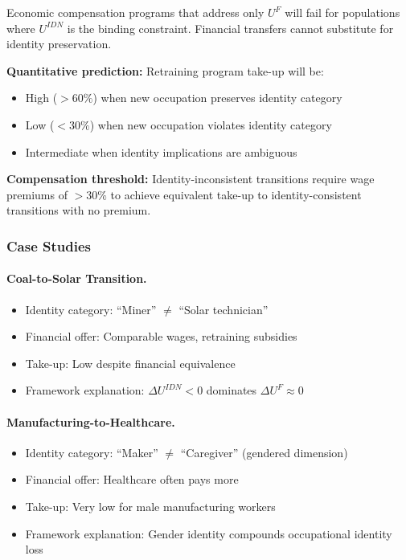 \begin{tcolorbox}[colback=blue!5!white, colframe=blue!75!black, title=Prediction 5: Identity Non-Fungibility]
Economic compensation programs that address only $U^F$ will fail for 
populations where $U^{IDN}$ is the binding constraint. Financial transfers 
cannot substitute for identity preservation.

\textbf{Quantitative prediction:} Retraining program take-up will be:
\begin{itemize}
  \item High ($>60\%$) when new occupation preserves identity category
  \item Low ($<30\%$) when new occupation violates identity category
  \item Intermediate when identity implications are ambiguous
\end{itemize}

\textbf{Compensation threshold:} Identity-inconsistent transitions require 
wage premiums of $>30\%$ to achieve equivalent take-up to identity-consistent 
transitions with no premium.
\end{tcolorbox}

\subsubsection{Case Studies}

\paragraph{Coal-to-Solar Transition.}
\begin{itemize}
  \item Identity category: ``Miner'' $\neq$ ``Solar technician''
  \item Financial offer: Comparable wages, retraining subsidies
  \item Take-up: Low despite financial equivalence
  \item Framework explanation: $\Delta U^{IDN} < 0$ dominates $\Delta U^F \approx 0$
\end{itemize}

\paragraph{Manufacturing-to-Healthcare.}
\begin{itemize}
  \item Identity category: ``Maker'' $\neq$ ``Caregiver'' (gendered dimension)
  \item Financial offer: Healthcare often pays more
  \item Take-up: Very low for male manufacturing workers
  \item Framework explanation: Gender identity compounds occupational identity loss
\end{itemize}


